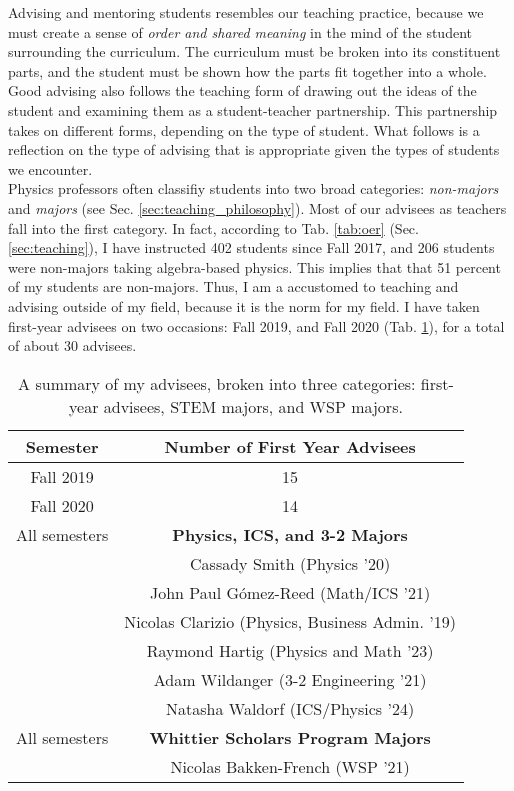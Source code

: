 \documentclass[../../../main.tex]{subfiles}
\begin{document}
Advising and mentoring students resembles our teaching practice, because we must create a sense of \textit{order and shared meaning} in the mind of the student surrounding the curriculum.  The curriculum must be broken into its constituent parts, and the student must be shown how the parts fit together into a whole.  Good advising also follows the teaching form of drawing out the ideas of the student and examining them as a student-teacher partnership.  This partnership takes on different forms, depending on the type of student.  What follows is a reflection on the type of advising that is appropriate given the types of students we encounter.
\\
\vspace{0.25cm}
Physics professors often classifiy students into two broad categories: \textit{non-majors} and \textit{majors} (see Sec. \ref{sec:teaching_philosophy}).  Most of our advisees as teachers fall into the first category.  In fact, according to Tab. \ref{tab:oer} (Sec. \ref{sec:teaching}), I have instructed 402 students since Fall 2017, and 206 students were non-majors taking algebra-based physics.  This implies that that 51 percent of my students are non-majors.  Thus, I am a accustomed to teaching and advising outside of my field, because it is the norm for my field.  I have taken first-year advisees on two occasions: Fall 2019, and Fall 2020 (Tab. \ref{tab:advisees}), for a total of about 30 advisees.

\begin{table}
\centering
\begin{tabular}{| c | c |}
\hline
\hline
Semester & \textbf{Number of First Year Advisees} \\ \hline
Fall 2019 & 15 \\ \hline
Fall 2020 & 14 \\ \hline
\hline
All semesters & \textbf{Physics, ICS, and 3-2 Majors} \\ \hline 
& Cassady Smith (Physics '20) \\ \hline
& John Paul G\'{o}mez-Reed (Math/ICS '21) \\ \hline
& Nicolas Clarizio (Physics, Business Admin. '19) \\ \hline
& Raymond Hartig (Physics and Math '23) \\ \hline
& Adam Wildanger (3-2 Engineering '21) \\ \hline
& Natasha Waldorf (ICS/Physics '24) \\ \hline \hline
All semesters & \textbf{Whittier Scholars Program Majors} \\ \hline
& Nicolas Bakken-French (WSP '21) \\ \hline
\end{tabular}
\caption{\label{tab:advisees} A summary of my advisees, broken into three categories: first-year advisees, STEM majors, and WSP majors.}
\end{table}
\end{document}
